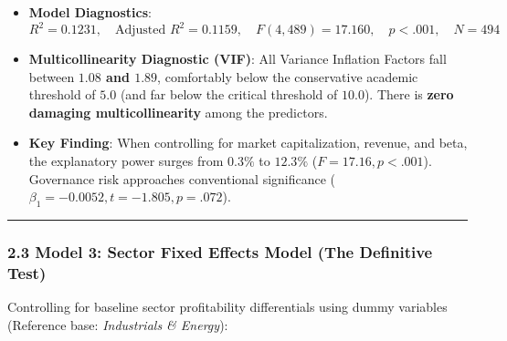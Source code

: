 \documentclass[
]{article}
\providecommand{\tightlist}{%
  \setlength{\itemsep}{0pt}\setlength{\parskip}{0pt}}
\begin{document}
\begin{itemize}
\tightlist
\item
  \textbf{Model Diagnostics}:
  \[R^2 = 0.1231, \quad \text{Adjusted } R^2 = 0.1159, \quad F(4, 489) = 17.160, \quad p < .001, \quad N = 494\]
\item
  \textbf{Multicollinearity Diagnostic (VIF)}: All Variance Inflation
  Factors fall between \textbf{\(1.08\) and \(1.89\)}, comfortably below
  the conservative academic threshold of \(5.0\) (and far below the
  critical threshold of \(10.0\)). There is \textbf{zero damaging
  multicollinearity} among the predictors.
\item
  \textbf{Key Finding}: When controlling for market capitalization,
  revenue, and beta, the explanatory power surges from \(0.3\%\) to
  \textbf{\(12.3\%\)} (\(F = 17.16, p < .001\)). Governance risk
  approaches conventional significance
  (\(\beta_1 = -0.0052, t = -1.805, p = .072\)).
\end{itemize}

\begin{center}\rule{0.5\linewidth}{0.5pt}\end{center}

\subsubsection{2.3 Model 3: Sector Fixed Effects Model (The Definitive
Test)}\label{model-3-sector-fixed-effects-model-the-definitive-test}

Controlling for baseline sector profitability differentials using dummy
variables (Reference base: \emph{Industrials \& Energy}):
\end{document}
